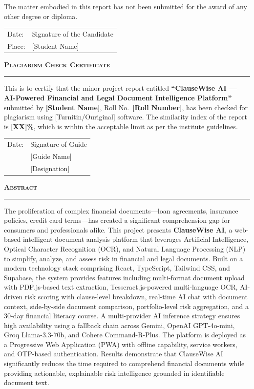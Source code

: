 \documentclass[12pt,a4paper,oneside]{report}
\newcommand{\chaptertitle}[1]{%
  \begin{center}
    \textsc{\Large\textbf{#1}}\\[2pt]
    \rule{0.5\textwidth}{0.5pt}
  \end{center}
}
\begin{document}
The matter embodied in this report has not been submitted for the award of any other degree or diploma.

\vspace{3cm}
\noindent
\begin{tabular}{p{}p{}}
  Date: & Signature of the Candidate \\[1cm]
  Place: & [Student Name] \\
\end{tabular}

\newpage
\chaptertitle{Plagiarism Check Certificate}

This is to certify that the minor project report entitled \textbf{``ClauseWise AI --- AI-Powered Financial and Legal Document Intelligence Platform''} submitted by \textbf{[Student Name]}, Roll No.\ \textbf{[Roll Number]}, has been checked for plagiarism using [Turnitin/Ouriginal] software. The similarity index of the report is \textbf{[XX]\%}, which is within the acceptable limit as per the institute guidelines.

\vspace{3cm}
\noindent
\begin{tabular}{p{}p{}}
  Date: & Signature of Guide \\[1cm]
  & [Guide Name] \\
  & [Designation] \\
\end{tabular}

\newpage
\chaptertitle{Abstract}

The proliferation of complex financial documents---loan agreements, insurance policies, credit card terms---has created a significant comprehension gap for consumers and professionals alike. This project presents \textbf{ClauseWise AI}, a web-based intelligent document analysis platform that leverages Artificial Intelligence, Optical Character Recognition (OCR), and Natural Language Processing (NLP) to simplify, analyze, and assess risk in financial and legal documents. Built on a modern technology stack comprising React, TypeScript, Tailwind CSS, and Supabase, the system provides features including multi-format document upload with PDF.js-based text extraction, Tesseract.js-powered multi-language OCR, AI-driven risk scoring with clause-level breakdown, real-time AI chat with document context, side-by-side document comparison, portfolio-level risk aggregation, and a 30-day financial literacy course. A multi-provider AI inference strategy ensures high availability using a fallback chain across Gemini, OpenAI GPT-4o-mini, Groq Llama-3.3-70b, and Cohere Command-R-Plus. The platform is deployed as a Progressive Web Application (PWA) with offline capability, service workers, and OTP-based authentication. Results demonstrate that ClauseWise AI significantly reduces the time required to comprehend financial documents while providing actionable, explainable risk intelligence grounded in identifiable document text.
\end{document}
